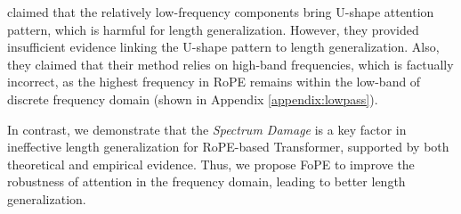 \citet{chen2024hope} claimed that the relatively low-frequency components bring U-shape attention pattern, which is harmful for length generalization. However, they provided insufficient evidence linking the U-shape pattern to length generalization. Also, they claimed that their method relies on high-band frequencies, which is factually incorrect, as the highest frequency in RoPE remains within the low-band of discrete frequency domain (shown in Appendix \ref{appendix:lowpass}). 

In contrast, we demonstrate that the \textit{Spectrum Damage} is a key factor in ineffective length generalization for RoPE-based Transformer, supported by both theoretical and empirical evidence. Thus, we propose FoPE to improve the robustness of attention in the frequency domain, leading to better length generalization.

\newpage


